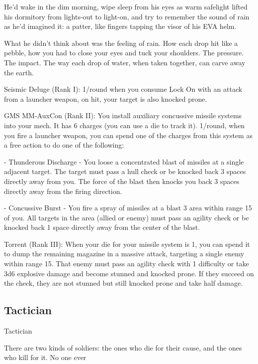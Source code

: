 He’d wake in the dim morning, wipe sleep from his eyes as warm safelight lifted his dormitory  
from lights-out to light-on, and try to remember the sound of rain as he’d imagined it: a patter, like  
fingers tapping the visor of his EVA helm.   

What he didn’t think about was the feeling of rain. How each drop hit like a pebble, how you had  
to close your eyes and tuck your shoulders. The pressure. The impact.   
The way each drop of water, when taken together, can carve away the earth.  

Seismic Deluge (Rank I): 1/round when you consume Lock On with an attack from a launcher  
weapon, on hit, your target is also knocked prone.
 
GMS MM-AuxCon (Rank II): You install auxiliary concussive missile systems into your mech. It  
has 6 charges (you can use a die to track it). 1/round, when you fire a launcher weapon, you can  
spend one of the charges from this system as a free action to do one of the following:
 
             -    Thunderous Discharge - You loose a concentrated blast of missiles at a single  
                  adjacent target. The target must pass a hull check or be knocked back 3 spaces  
                  directly away from you. The force of the blast then knocks you back 3 spaces  
                  directly away from the firing direction.
 
             -    Concussive Burst - You fire a spray of missiles at a blast 3 area within range 15 of  
                  you. All targets in the area (allied or enemy) must pass an agility check or be  
                  knocked back 1 space directly away from the center of the blast.
 
Torrent (Rank III): When your die for your missile system is 1, you can spend it to dump the  
remaining magazine in a massive attack, targeting a single enemy within range 15. That enemy  
must pass an agility check with 1 difficulty or take 3d6 explosive damage and become stunned  
and knocked prone. If they succeed on the check, they are not stunned but still knocked prone  
and take half damage.
 
\subsection{Tactician}

                                                   Tactician  

There are two kinds of soldiers: the ones who die for their cause, and the ones who kill for it. No one ever  

